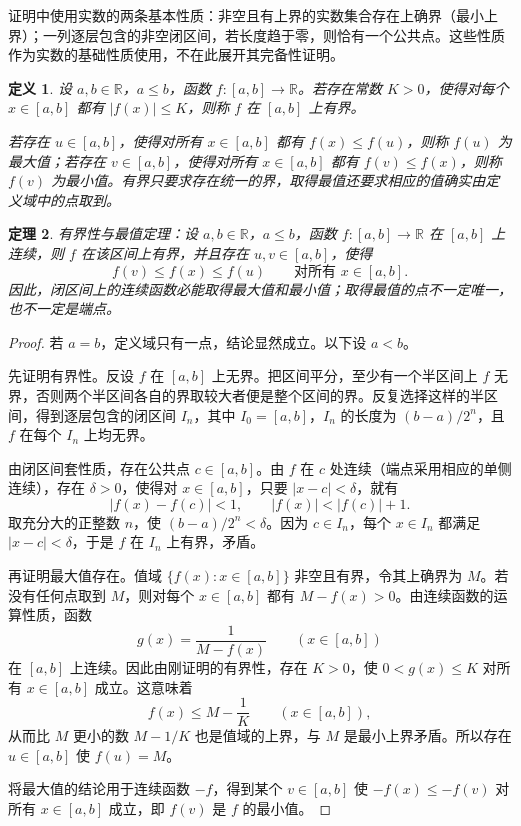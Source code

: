 \documentclass[UTF8,fontset=fandol,11pt]{ctexart}
\newtheorem{definition}{定义}[section]
\newtheorem{theorem}[definition]{定理}
\begin{document}
证明中使用实数的两条基本性质：非空且有上界的实数集合存在上确界（最小上界）；一列逐层包含的非空闭区间，若长度趋于零，则恰有一个公共点。这些性质作为实数的基础性质使用，不在此展开其完备性证明。\par
\begin{definition}
\label{def:bounded-on-closed-interval}设 $a,b\in\mathbb{R}$，$a\leq b$，函数 $f:[a,b]\to\mathbb{R}$。若存在常数 $K>0$，使得对每个 $x\in[a,b]$ 都有 $|f(x)|\leq K$，则称 $f$ 在 $[a,b]$ 上有界。

若存在 $u\in[a,b]$，使得对所有 $x\in[a,b]$ 都有 $f(x)\leq f(u)$，则称 $f(u)$ 为最大值；若存在 $v\in[a,b]$，使得对所有 $x\in[a,b]$ 都有 $f(v)\leq f(x)$，则称 $f(v)$ 为最小值。有界只要求存在统一的界，取得最值还要求相应的值确实由定义域中的点取到。
\end{definition}
\begin{theorem}
\label{thm:extreme-value-theorem}有界性与最值定理：设 $a,b\in\mathbb{R}$，$a\leq b$，函数 $f:[a,b]\to\mathbb{R}$ 在 $[a,b]$ 上连续，则 $f$ 在该区间上有界，并且存在 $u,v\in[a,b]$，使得
\[
f(v)\leq f(x)\leq f(u)\qquad\text{对所有 }x\in[a,b].
\]
因此，闭区间上的连续函数必能取得最大值和最小值；取得最值的点不一定唯一，也不一定是端点。
\end{theorem}
\begin{proof}
若 $a=b$，定义域只有一点，结论显然成立。以下设 $a<b$。

先证明有界性。反设 $f$ 在 $[a,b]$ 上无界。把区间平分，至少有一个半区间上 $f$ 无界，否则两个半区间各自的界取较大者便是整个区间的界。反复选择这样的半区间，得到逐层包含的闭区间 $I_n$，其中 $I_0=[a,b]$，$I_n$ 的长度为 $(b-a)/2^n$，且 $f$ 在每个 $I_n$ 上均无界。

由闭区间套性质，存在公共点 $c\in[a,b]$。由 $f$ 在 $c$ 处连续（端点采用相应的单侧连续），存在 $\delta>0$，使得对 $x\in[a,b]$，只要 $|x-c|<\delta$，就有
\[
|f(x)-f(c)|<1,\qquad |f(x)|<|f(c)|+1.
\]
取充分大的正整数 $n$，使 $(b-a)/2^n<\delta$。因为 $c\in I_n$，每个 $x\in I_n$ 都满足 $|x-c|<\delta$，于是 $f$ 在 $I_n$ 上有界，矛盾。

再证明最大值存在。值域 $\{f(x):x\in[a,b]\}$ 非空且有界，令其上确界为 $M$。若没有任何点取到 $M$，则对每个 $x\in[a,b]$ 都有 $M-f(x)>0$。由连续函数的运算性质，函数
\[
g(x)=\frac{1}{M-f(x)}\qquad(x\in[a,b])
\]
在 $[a,b]$ 上连续。因此由刚证明的有界性，存在 $K>0$，使 $0<g(x)\leq K$ 对所有 $x\in[a,b]$ 成立。这意味着
\[
f(x)\leq M-\frac{1}{K}\qquad(x\in[a,b]),
\]
从而比 $M$ 更小的数 $M-1/K$ 也是值域的上界，与 $M$ 是最小上界矛盾。所以存在 $u\in[a,b]$ 使 $f(u)=M$。

将最大值的结论用于连续函数 $-f$，得到某个 $v\in[a,b]$ 使 $-f(x)\leq-f(v)$ 对所有 $x\in[a,b]$ 成立，即 $f(v)$ 是 $f$ 的最小值。
\end{proof}
\end{document}
